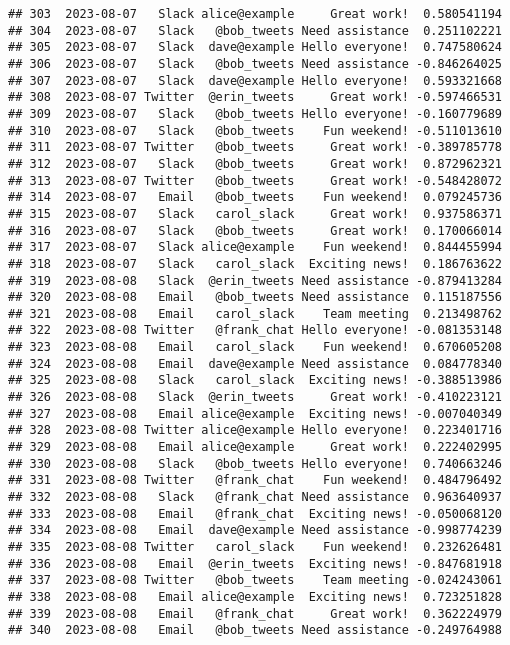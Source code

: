 \documentclass[
]{article}
\begin{document}
\begin{verbatim}
## 303  2023-08-07   Slack alice@example     Great work!  0.580541194
## 304  2023-08-07   Slack   @bob_tweets Need assistance  0.251102221
## 305  2023-08-07   Slack  dave@example Hello everyone!  0.747580624
## 306  2023-08-07   Slack   @bob_tweets Need assistance -0.846264025
## 307  2023-08-07   Slack  dave@example Hello everyone!  0.593321668
## 308  2023-08-07 Twitter  @erin_tweets     Great work! -0.597466531
## 309  2023-08-07   Slack   @bob_tweets Hello everyone! -0.160779689
## 310  2023-08-07   Slack   @bob_tweets    Fun weekend! -0.511013610
## 311  2023-08-07 Twitter   @bob_tweets     Great work! -0.389785778
## 312  2023-08-07   Slack   @bob_tweets     Great work!  0.872962321
## 313  2023-08-07 Twitter   @bob_tweets     Great work! -0.548428072
## 314  2023-08-07   Email   @bob_tweets    Fun weekend!  0.079245736
## 315  2023-08-07   Slack   carol_slack     Great work!  0.937586371
## 316  2023-08-07   Slack   @bob_tweets     Great work!  0.170066014
## 317  2023-08-07   Slack alice@example    Fun weekend!  0.844455994
## 318  2023-08-07   Slack   carol_slack  Exciting news!  0.186763622
## 319  2023-08-08   Slack  @erin_tweets Need assistance -0.879413284
## 320  2023-08-08   Email   @bob_tweets Need assistance  0.115187556
## 321  2023-08-08   Email   carol_slack    Team meeting  0.213498762
## 322  2023-08-08 Twitter   @frank_chat Hello everyone! -0.081353148
## 323  2023-08-08   Email   carol_slack    Fun weekend!  0.670605208
## 324  2023-08-08   Email  dave@example Need assistance  0.084778340
## 325  2023-08-08   Slack   carol_slack  Exciting news! -0.388513986
## 326  2023-08-08   Slack  @erin_tweets     Great work! -0.410223121
## 327  2023-08-08   Email alice@example  Exciting news! -0.007040349
## 328  2023-08-08 Twitter alice@example Hello everyone!  0.223401716
## 329  2023-08-08   Email alice@example     Great work!  0.222402995
## 330  2023-08-08   Slack   @bob_tweets Hello everyone!  0.740663246
## 331  2023-08-08 Twitter   @frank_chat    Fun weekend!  0.484796492
## 332  2023-08-08   Slack   @frank_chat Need assistance  0.963640937
## 333  2023-08-08   Email   @frank_chat  Exciting news! -0.050068120
## 334  2023-08-08   Email  dave@example Need assistance -0.998774239
## 335  2023-08-08 Twitter   carol_slack    Fun weekend!  0.232626481
## 336  2023-08-08   Email  @erin_tweets  Exciting news! -0.847681918
## 337  2023-08-08 Twitter   @bob_tweets    Team meeting -0.024243061
## 338  2023-08-08   Email alice@example  Exciting news!  0.723251828
## 339  2023-08-08   Email   @frank_chat     Great work!  0.362224979
## 340  2023-08-08   Email   @bob_tweets Need assistance -0.249764988

\end{verbatim}
\end{document}
